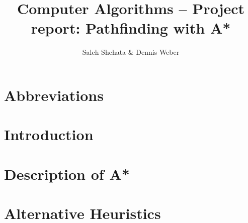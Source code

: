 \documentclass[12pt]{article}
\begin{document}
	
\title{Computer Algorithms -- Project report: Pathfinding with A*}
\author{Saleh Shehata \& Dennis Weber}
\maketitle

\begin{abstract}
\end{abstract}

\section*{Abbreviations}
\begin{acronym}[SIFT]
	\setlength{\parskip}{0ex}
	\setlength{\itemsep}{1ex}
\end{acronym}

\section{Introduction}

\section{Description of A*}

\section{Alternative Heuristics}


\printbibliography

\end{document}
